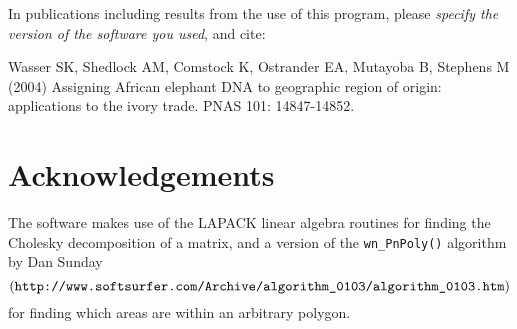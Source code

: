 \documentclass[10pt,titlepage,times,letterpaper]{article}
\begin{document}
In publications including results from the use of this program, please
{\it specify the version of the software you used}, and cite:

Wasser SK, Shedlock AM, Comstock K, Ostrander EA, Mutayoba B, Stephens M (2004)
Assigning African elephant DNA to geographic region of origin:  applications
to the ivory trade.  PNAS 101: 14847-14852.


\section{Acknowledgements}

The software makes use of the LAPACK linear algebra routines for
finding the Cholesky decomposition of a matrix, and a version of the
{\tt wn\_PnPoly()} algorithm by Dan Sunday 
$$(\text{\tt http://www.softsurfer.com/Archive/algorithm\_0103/algorithm\_0103.htm})$$
for finding which areas are within an arbitrary polygon.


%
%
\end{document}
